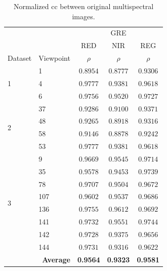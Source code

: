 \renewcommand{\arraystretch}{1.2}
\begin{table}
    \footnotesize
    \caption{Normalized \acrshort{cc} between original multispectral images. }
    \label{table:multispectral_base_correlation}
    \begin{tabular}{ll|c@{\hskip 0.5in}c@{\hskip 0.5in}c}
        \toprule
        & & \multicolumn{3}{c}{GRE} \\
        \cmidrule{1-5}
        & & RED & NIR & REG \\
        \cmidrule{1-5}
        Dataset & Viewpoint & $\rho$ & $\rho$ & $\rho$ \\
        \cmidrule{1-5}
        \multirow{3}{*}{1} & 1 & $0.8954$ & $0.8777$ & $0.9306$\\
        & 4 & $0.9777$ & $0.9381$ & $0.9618$\\
        & 6 & $0.9756$ & $0.9520$ & $0.9727$\\
        \cmidrule{1-5}
        \multirow{4}{*}{2} & 37 & $0.9286$ & $0.9100$ & $0.9371$\\
        & 48 & $0.9265$ & $0.8918$ & $0.9316$\\
        & 58 & $0.9146$ & $0.8878$ & $0.9242$\\
        & 53 & $0.9777$ & $0.9381$ & $0.9618$\\
        \cmidrule{1-5}
        \multirow{8}{*}{3} & 9 & $0.9669$ & $0.9545$ & $0.9714$\\
        & 35 & $0.9578$ & $0.9453$ & $0.9739$\\
        & 78 & $0.9707$ & $0.9504$ & $0.9672$\\
        & 107 & $0.9602$ & $0.9537$ & $0.9686$\\
        & 136 & $0.9755$ & $0.9612$ & $0.9692$\\
        & 141 & $0.9732$ & $0.9551$ & $0.9744$\\
        & 142 & $0.9728$ & $0.9375$ & $0.9656$\\
        & 144 & $0.9731$ & $0.9316$ & $0.9622$\\
        \cmidrule{1-5}
        \multicolumn{2}{r|}{\textbf{Average}} & \textbf{0.9564} & \textbf{0.9323} & \textbf{0.9581}\\
        \bottomrule
    \end{tabular}
    \normalsize
\end{table}
\renewcommand{\arraystretch}{1}

